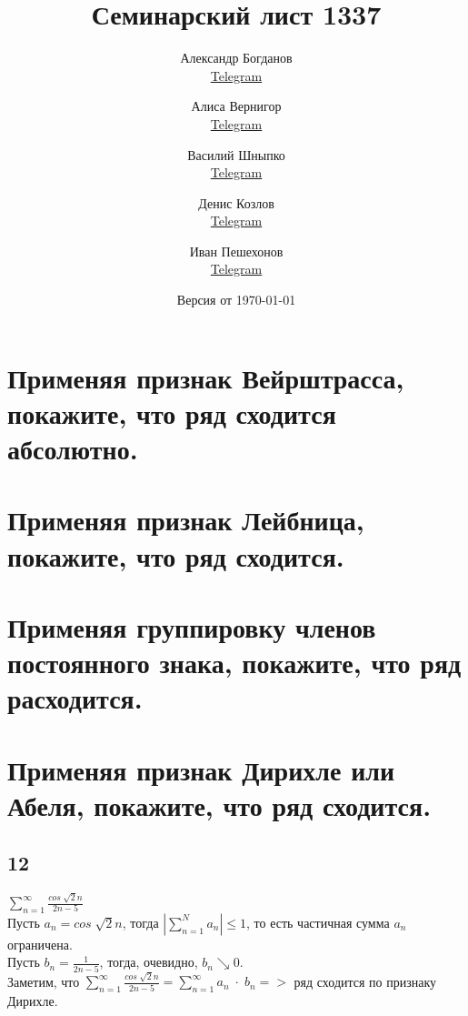 \documentclass[a4paper,fleqn]{article}
\title{Семинарский лист 1337}
\author{
    Александр Богданов \\ \href{https://t.me/SphericalPotatoInVacuum}{Telegram} \and
    Алиса Вернигор     \\ \href{https://t.me/allisyonok}{Telegram} \and
    Василий Шныпко     \\ \href{https://t.me/yourvash}{Telegram} \and
    Денис Козлов       \\ \href{https://t.me/DKozl50}{Telegram} \and
    Иван Пешехонов     \\ \href{https://t.me/JohanDDC}{Telegram}
}
\date{Версия от {\ddmmyyyydate\today} \currenttime}
\begin{document}
    \maketitle
    \section*{Применяя признак Вейрштрасса, покажите, что ряд сходится абсолютно.}


    
    \section*{Применяя признак Лейбница, покажите, что ряд сходится.}


    
    \section*{Применяя группировку членов постоянного знака, покажите, что ряд расходится.}




    
    \section*{Применяя признак Дирихле или Абеля, покажите, что ряд сходится.}
    \subsection*{12}
    $\displaystyle \sum\limits_{n = 1}^{\infty} \frac{cos \; \sqrt{2}n}{2n - 5}$ \\
    Пусть $\displaystyle a_n = cos \; \sqrt{2}n$, тогда $\left| \sum\limits_{n = 1}^N a_n \right| \leq 1$, то есть частичная сумма $\displaystyle a_n$ ограничена. \\
    Пусть $\displaystyle b_n = \frac{1}{2n - 5}$, тогда, очевидно, $b_n \searrow 0$. \\
    Заметим, что $\displaystyle \sum\limits_{n = 1}^{\infty} \frac{cos \; \sqrt{2}n}{2n - 5} = \sum\limits_{n = 1}^{\infty} a_n \; \cdot \; b_n =>$ ряд сходится по признаку Дирихле. \\ 
\end{document}
